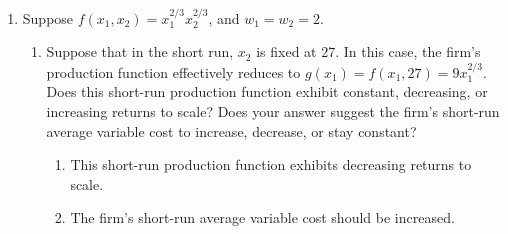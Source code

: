 \documentclass[11pt]{article}
\begin{document}
\begin{enumerate}
\item Suppose $f(x_{1},x_{2})=x_{1}^{2/3}x_{2}^{2/3}$, and $w_{1}=w_{2}=2$.
    \begin{enumerate}
        \item Suppose that in the short run, $x_{2}$ is fixed at $27$. In this case, the firm's production function effectively reduces to $g(x_{1})=f(x_{1},27)=9x_{1}^{2/3}$. Does this short-run production function exhibit constant, decreasing, or increasing returns to scale? Does your answer suggest the firm's short-run average variable cost to increase, decrease, or stay constant?
        \begin{enumerate}
            \item This short-run production function exhibits decreasing returns to scale.
            \item The firm's short-run average variable cost should be increased.
        \end{enumerate}


\end{enumerate}
\end{enumerate}
\end{document}
